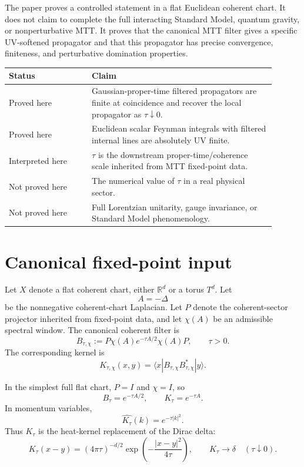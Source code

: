 \documentclass[11pt]{article}
\begin{document}
The paper proves a controlled statement in a flat Euclidean coherent chart. It does not claim to complete the full interacting Standard Model, quantum gravity, or nonperturbative MTT. It proves that the canonical MTT filter gives a specific UV-softened propagator and that this propagator has precise convergence, finiteness, and perturbative domination properties.

\begin{center}
\begin{tabular}{p{0.28\linewidth}p{0.62\linewidth}}
\toprule
Status & Claim \\
\midrule
Proved here & Gaussian-proper-time filtered propagators are finite at coincidence and recover the local propagator as \(\tau\downarrow0\). \\
Proved here & Euclidean scalar Feynman integrals with filtered internal lines are absolutely UV finite. \\
Interpreted here & \(\tau\) is the downstream proper-time/coherence scale inherited from MTT fixed-point data. \\
Not proved here & The numerical value of \(\tau\) in a real physical sector. \\
Not proved here & Full Lorentzian unitarity, gauge invariance, or Standard Model phenomenology. \\
\bottomrule
\end{tabular}
\end{center}

\section{Canonical fixed-point input}

Let \(X\) denote a flat coherent chart, either \(\mathbb R^d\) or a torus \(T^d\). Let
\[
        A=-\Delta
\]
be the nonnegative coherent-chart Laplacian. Let \(P\) denote the coherent-sector projector inherited from fixed-point data, and let \(\chi(A)\) be an admissible spectral window. The canonical coherent filter is
\[
        B_{\tau,\chi}
        :=
        P\chi(A)e^{-\tau A/2}\chi(A)P ,
        \qquad \tau>0.
\]
The corresponding kernel is
\[
        K_{\tau,\chi}(x,y)
        =
        \langle x|B_{\tau,\chi}B_{\tau,\chi}^{\ast}|y\rangle .
\]

In the simplest full flat chart, \(P=I\) and \(\chi=I\), so
\[
        B_\tau=e^{-\tau A/2},
        \qquad
        K_\tau=e^{-\tau A}.
\]
In momentum variables,
\[
        \widehat{K_\tau}(k)=e^{-\tau |k|^2}.
\]
Thus \(K_\tau\) is the heat-kernel replacement of the Dirac delta:
\[
        K_\tau(x-y)
        =
        (4\pi\tau)^{-d/2}\exp\!\left(-\frac{|x-y|^2}{4\tau}\right),
        \qquad
        K_\tau\to\delta
        \quad(\tau\downarrow0).
\]
\end{document}

